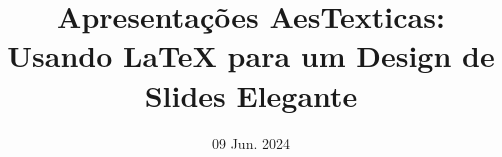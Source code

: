 \documentclass[12pt,a4paper,violet]{bbe}
\begin{document}

\clearpage %
\title{Apresentações AesTexticas: \\ Usando LaTeX para um Design de Slides Elegante}
\date{09 Jun. 2024}

\maketitle




\end{document}
